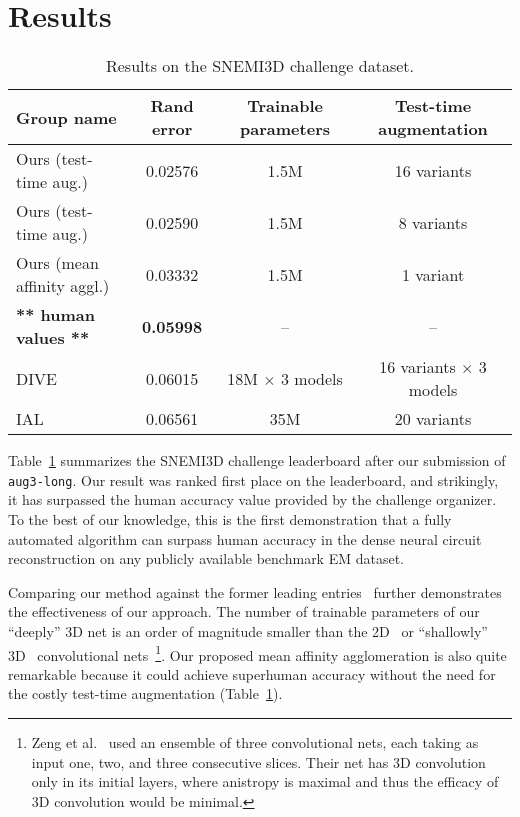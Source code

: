\documentclass{article}
\begin{document}
\section{Results}
\label{results}

\begin{table}[!b]
\caption{Results on the SNEMI3D challenge dataset.
\label{tab:SNEMI3D}}
\begin{center}
\begin{tabular}{|l|c|c|c|}
\hline
Group name & Rand error & Trainable parameters & Test-time augmentation \\
\hline
Ours (test-time aug.) & 0.02576 & 1.5M & 16 variants \\
Ours (test-time aug.) & 0.02590 & 1.5M & 8 variants \\
Ours (mean affinity aggl.) & 0.03332 & 1.5M & 1 variant \\
\textbf{** human values **} & \textbf{0.05998} & -- & -- \\
DIVE~\cite{zeng2017} & 0.06015 & 18M $\times$ 3 models & 16 variants $\times$ 3 models \\
IAL~\cite{beier2017} & 0.06561 & 35M & 20 variants \\
\hline
\end{tabular}
\end{center}
\end{table}

Table~\ref{tab:SNEMI3D} summarizes the SNEMI3D challenge leaderboard after our
submission of \texttt{aug3-long}. Our result was ranked first place on the
leaderboard, and strikingly, it has surpassed the human accuracy value provided
by the challenge organizer. To the best of our knowledge, this is the first
demonstration that a fully automated algorithm can surpass human accuracy in the
dense neural circuit reconstruction on any publicly available benchmark EM
dataset.

Comparing our method against the former leading
entries~\cite{zeng2017,beier2017} further demonstrates the effectiveness of our
approach. The number of trainable parameters of our ``deeply'' 3D net is an
order of magnitude smaller than the 2D~\cite{beier2017} or ``shallowly''
3D~\cite{zeng2017} convolutional nets~\footnote{Zeng et al.~\cite{zeng2017} used
an ensemble of three convolutional nets, each taking as input one, two, and
three consecutive slices. Their net has 3D convolution only in its initial
layers, where anistropy is maximal and thus the efficacy of 3D convolution would
be minimal.}. Our proposed mean affinity agglomeration is also quite remarkable
because it could achieve superhuman accuracy without the need for the costly
test-time augmentation (Table~\ref{tab:SNEMI3D}).
\end{document}
